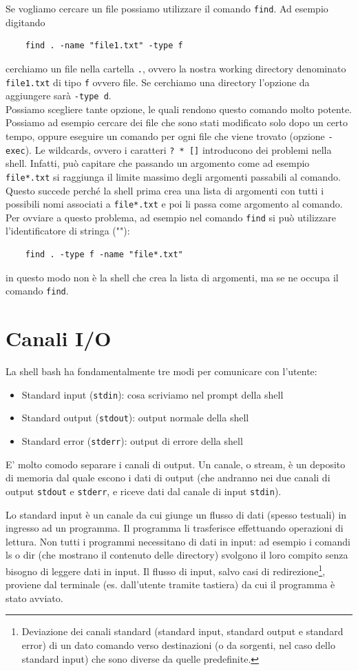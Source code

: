 Se vogliamo cercare un file possiamo utilizzare il comando \verb"find". Ad esempio digitando 
\begin{verbatim}
	find . -name "file1.txt" -type f
\end{verbatim}
cerchiamo un file nella cartella \verb".", ovvero la nostra working directory denominato \verb"file1.txt" di tipo \verb"f" ovvero file. Se cerchiamo una directory l'opzione da aggiungere sarà \verb"-type d".\\
Possiamo scegliere tante opzione, le quali rendono questo comando molto potente. Possiamo ad esempio cercare dei file che sono stati modificato solo dopo un certo tempo, oppure eseguire un comando per ogni file che viene trovato (opzione \verb"-exec"). Le wildcards, ovvero i caratteri \verb"? * []" introducono dei problemi nella shell. Infatti, può capitare che passando un argomento come ad esempio \verb"file*.txt" si raggiunga il limite massimo degli argomenti passabili al comando. Questo succede perché la shell prima crea una lista di argomenti con tutti i possibili nomi associati a \verb"file*.txt" e poi li passa come argomento al comando. Per ovviare a questo problema, ad esempio nel comando \verb"find" si può utilizzare l'identificatore di stringa (\verb""""):
\begin{verbatim}
	find . -type f -name "file*.txt"
\end{verbatim}
in questo modo non è la shell che crea la lista di argomenti, ma se ne occupa il comando \verb"find". 

\section{Canali I/O}
La shell bash ha fondamentalmente tre modi per comunicare con l'utente:
\begin{itemize}
	\item Standard input (\verb"stdin"): cosa scriviamo nel prompt della shell
	\item Standard output (\verb"stdout"): output normale della shell
	\item Standard error (\verb"stderr"): output di errore della shell
\end{itemize}
E' molto comodo separare i canali di output. Un canale, o stream, è un deposito di memoria dal quale escono i dati di output (che andranno nei due canali di output \verb"stdout" e \verb"stderr", e riceve dati dal canale di input \verb"stdin"). 

Lo standard input è un canale da cui giunge un flusso di dati (spesso testuali) in ingresso ad un programma. Il programma li trasferisce effettuando operazioni di lettura. Non tutti i programmi necessitano di dati in input: ad esempio i comandi ls o dir (che mostrano il contenuto delle directory) svolgono il loro compito senza bisogno di leggere dati in input.
Il flusso di input, salvo casi di redirezione\footnote{Deviazione dei canali standard (standard input, standard output e standard error) di un dato comando verso destinazioni (o da sorgenti, nel caso dello standard input) che sono diverse da quelle predefinite.}, proviene dal terminale (es. dall'utente tramite tastiera) da cui il programma è stato avviato. 

